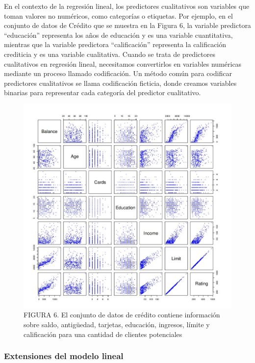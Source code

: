 \documentclass[
  letterpaper,
  DIV=11,
  numbers=noendperiod]{scrartcl}
\begin{document}
En el contexto de la regresión lineal, los predictores cualitativos son
variables que toman valores no numéricos, como categorías o etiquetas.
Por ejemplo, en el conjunto de datos de Crédito que se muestra en la
Figura 6, la variable predictora ``educación'' representa los años de
educación y es una variable cuantitativa, mientras que la variable
predictora ``calificación'' representa la calificación crediticia y es
una variable cualitativa. Cuando se trata de predictores cualitativos en
regresión lineal, necesitamos convertirlos en variables numéricas
mediante un proceso llamado codificación. Un método común para codificar
predictores cualitativos se llama codificación ficticia, donde creamos
variables binarias para representar cada categoría del predictor
cualitativo.

\begin{figure}

{\centering \includegraphics{images/sda.jpg}

}

\caption{FIGURA 6. El conjunto de datos de crédito contiene información
sobre saldo, antigüedad, tarjetas, educación, ingresos, límite y
calificación para una cantidad de clientes potenciales}

\end{figure}

\hypertarget{extensiones-del-modelo-lineal}{%
\subsubsection{Extensiones del modelo
lineal}\label{extensiones-del-modelo-lineal}}
\end{document}

